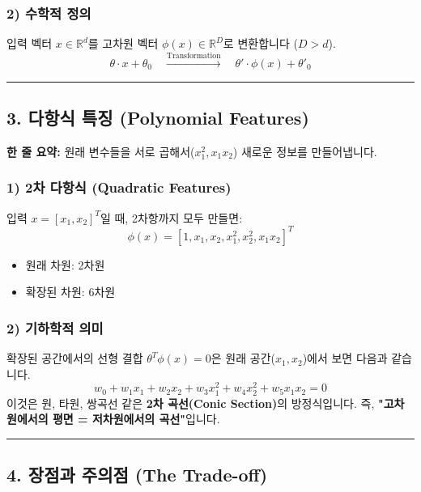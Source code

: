 \documentclass[11pt,a4paper]{book}
\theoremstyle{definition}
\begin{document}
\subsubsection*{2) 수학적 정의}
입력 벡터 $x \in \mathbb{R}^d$를 고차원 벡터 $\phi(x) \in \mathbb{R}^D$로 변환합니다 ($D > d$).
$$ \theta \cdot x + \theta_0 \quad \xrightarrow{\text{Transformation}} \quad \theta' \cdot \phi(x) + \theta'_0 $$

\vspace{0.5cm}\hrule\vspace{0.5cm}

\subsection{3. 다항식 특징 (Polynomial Features)}

\begin{conceptbox}[title={개념 3: 곱셈으로 특징 만들기}]
\textbf{한 줄 요약:} 원래 변수들을 서로 곱해서($x_1^2, x_1 x_2$) 새로운 정보를 만들어냅니다.
\end{conceptbox}

\subsubsection*{1) 2차 다항식 (Quadratic Features)}
입력 $x = [x_1, x_2]^T$일 때, 2차항까지 모두 만들면:
$$ \phi(x) = [1, x_1, x_2, x_1^2, x_2^2, x_1 x_2]^T $$
\begin{itemize}
    \item 원래 차원: 2차원
    \item 확장된 차원: 6차원
\end{itemize}

\subsubsection*{2) 기하학적 의미}
확장된 공간에서의 선형 결합 $\theta^T \phi(x) = 0$은 원래 공간($x_1, x_2$)에서 보면 다음과 같습니다.
$$ w_0 + w_1 x_1 + w_2 x_2 + w_3 x_1^2 + w_4 x_2^2 + w_5 x_1 x_2 = 0 $$
이것은 원, 타원, 쌍곡선 같은 \textbf{2차 곡선(Conic Section)}의 방정식입니다.
즉, \textbf{"고차원에서의 평면 = 저차원에서의 곡선"}입니다.

\vspace{0.5cm}\hrule\vspace{0.5cm}

\subsection{4. 장점과 주의점 (The Trade-off)}
\end{document}
